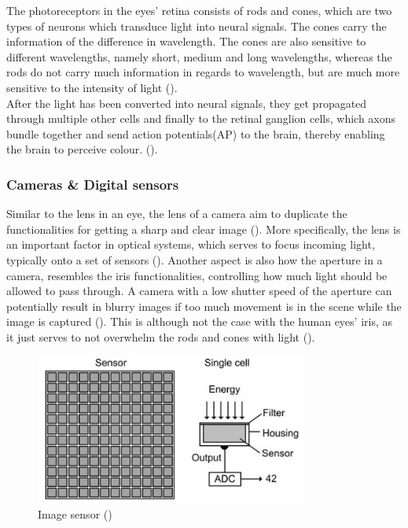 \documentclass{article}
\newcommand{\goodcite}[1]{ {(\cite{#1})}}
\begin{document}
The photoreceptors in the eyes' retina consists of rods and cones, which are two types of neurons which transduce light into neural signals. The cones carry the information of the difference in wavelength. The cones are also sensitive to different wavelengths, namely short, medium and long wavelengths, whereas the rods do not carry much information in regards to wavelength, but are much more sensitive to the intensity of light\goodcite{hsp}.\\After the light has been converted into neural signals, they get propagated through multiple other cells and finally to the retinal ganglion cells, which axons bundle together and send action potentials(AP) to the brain, thereby enabling the brain to perceive colour.\goodcite{hsp}.\\

\subsubsection{Cameras \& Digital sensors}
Similar to the lens in an eye, the lens of a camera aim to duplicate the functionalities for getting a sharp and clear image\goodcite{IP}. More specifically, the lens is an important factor in optical systems, which serves to focus incoming light, typically onto a set of sensors\goodcite{IP}. Another aspect is also how the aperture in a camera, resembles the iris functionalities, controlling how much light should be allowed to pass through. A camera with a low shutter speed of the aperture can potentially result in blurry images if too much movement is in the scene while the image is captured\goodcite{IP}. This is although not the case with the human eyes' iris, as it just serves to not overwhelm the rods and cones with light\goodcite{hsp}.

\begin{figure}[H]
    \centering
    \includegraphics[width=0.8\textwidth]{img/sensor.png}
    \caption{Image sensor\goodcite{IP}}
    \label{fig:Image_sensor}
\end{figure}
\end{document}
